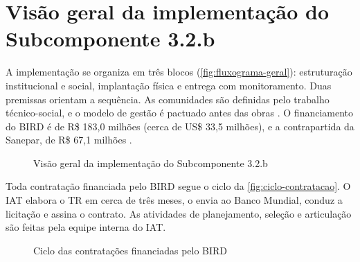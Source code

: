 \section{Visão geral da implementação do Subcomponente 3.2.b}
\label{sec:arranjo}

A implementação se organiza em três blocos (\autoref{fig:fluxograma-geral}):
estruturação institucional e social, implantação física e entrega com
monitoramento. Duas premissas orientam a sequência. As comunidades são
definidas pelo trabalho técnico-social, e o modelo de gestão é pactuado antes
das obras \cite{mop2026}. O financiamento do BIRD é de R\$ 183,0 milhões
(cerca de US\$ 33,5 milhões), e a contrapartida da Sanepar, de R\$ 67,1 milhões
\cite{custo2026}.

\begin{figure}[htbp]
  \centering
  \caption{Visão geral da implementação do Subcomponente 3.2.b}
  \label{fig:fluxograma-geral}
\end{figure}

Toda contratação financiada pelo BIRD segue o ciclo da
\autoref{fig:ciclo-contratacao}. O IAT elabora o TR em cerca de três meses, o
envia ao Banco Mundial, conduz a licitação e assina o contrato. As atividades
de planejamento, seleção e articulação são feitas pela equipe interna do IAT.

\begin{figure}[htbp]
  \centering
  \caption{Ciclo das contratações financiadas pelo BIRD}
  \label{fig:ciclo-contratacao}
\end{figure}
